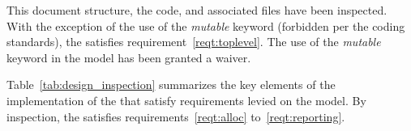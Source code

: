 %
% 

\label{inspect:TLI}
This document structure, the code, and associated files have been inspected.
With the exception of the use of the \emph{mutable} keyword (forbidden per the
coding standards), the \ModelDesc satisfies requirement~\ref{reqt:toplevel}.
The use of the \emph{mutable} keyword in the model has been granted a waiver.

\label{inspect:design} 
Table~\ref{tab:design_inspection} summarizes the key elements of the
implementation of the \ModelDesc that satisfy requirements levied on the model.
By inspection, the \ModelDesc satisfies
requirements~\ref{reqt:alloc} to~\ref{reqt:reporting}.

